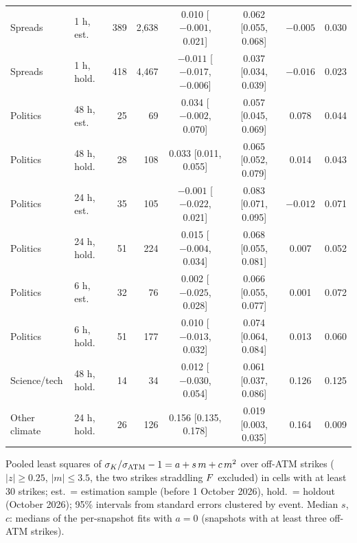 \begin{table}[ht]
\begin{threeparttable}
\begin{tabular}{@{}llrrcccc@{}}
Spreads & 1 h, est. & 389 & 2,638 & 0.010 [$-0.001$, 0.021] & 0.062 [0.055, 0.068] & $-0.005$ & 0.030 \\
Spreads & 1 h, hold. & 418 & 4,467 & $-0.011$ [$-0.017$, $-0.006$] & 0.037 [0.034, 0.039] & $-0.016$ & 0.023 \\
Politics & 48 h, est. & 25 & 69 & 0.034 [$-0.002$, 0.070] & 0.057 [0.045, 0.069] & 0.078 & 0.044 \\
Politics & 48 h, hold. & 28 & 108 & 0.033 [0.011, 0.055] & 0.065 [0.052, 0.079] & 0.014 & 0.043 \\
Politics & 24 h, est. & 35 & 105 & $-0.001$ [$-0.022$, 0.021] & 0.083 [0.071, 0.095] & $-0.012$ & 0.071 \\
Politics & 24 h, hold. & 51 & 224 & 0.015 [$-0.004$, 0.034] & 0.068 [0.055, 0.081] & 0.007 & 0.052 \\
Politics & 6 h, est. & 32 & 76 & 0.002 [$-0.025$, 0.028] & 0.066 [0.055, 0.077] & 0.001 & 0.072 \\
Politics & 6 h, hold. & 51 & 177 & 0.010 [$-0.013$, 0.032] & 0.074 [0.064, 0.084] & 0.013 & 0.060 \\
Science/tech & 48 h, hold. & 14 & 34 & 0.012 [$-0.030$, 0.054] & 0.061 [0.037, 0.086] & 0.126 & 0.125 \\
Other climate & 24 h, hold. & 26 & 126 & 0.156 [0.135, 0.178] & 0.019 [0.003, 0.035] & 0.164 & 0.009 \\
\bottomrule
\end{tabular}
\begin{tablenotes}[flushleft]\footnotesize
\item Pooled least squares of $\sigma_K/\sigma_{\mathrm{ATM}}-1=a+s\,m+c\,m^2$ over off-ATM strikes ($|z|\ge0.25$,
$|m|\le3.5$, the two strikes straddling $F$ excluded) in cells with at least 30 strikes;
est.\ = estimation sample (before 1 October 2026), hold.\ = holdout (October 2026); 95\% intervals
from standard errors clustered by event. Median $s$, $c$: medians of the per-snapshot fits with
$a=0$ (snapshots with at least three off-ATM strikes).
\end{tablenotes}
\end{threeparttable}
\end{table}

